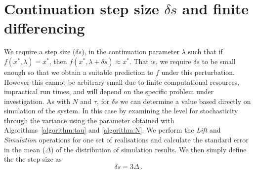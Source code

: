 \documentclass[11pt]{article}
\begin{document}
\section{Continuation step size $\delta s$ and finite differencing}
\label{sec:parametersDs}

We require a step size ($\delta s$), in the continuation parameter $\lambda$ such that if $f(x^\ast,\lambda) = x^\ast$, then $f(x^\ast,\lambda+\delta s) \approx x^\ast$. That is, we require $\delta s$ to be small enough so that we obtain a suitable prediction to $f$ under this perturbation. However this cannot be arbitrary small due to finite computational resources, impractical run times, and will depend on the specific problem under investigation. As with $N$ and $\tau$, for $\delta s$ we can determine a value based directly on simulation of the system. In this case by examining the level for stochasticity through the variance using the parameter obtained with Algorithms~\ref{algorithm:tau} and \ref{algorithm:N}. We perform the {\it Lift} and {\it Simulation} operations for one set of realisations and calculate the standard error in the mean ($\Delta$) of the distribution of simulation results. We then simply define the the step size as 
\begin{equation}
	\delta s = 3 \Delta~.
	\label{eq:ds}
\end{equation}

\end{document}
